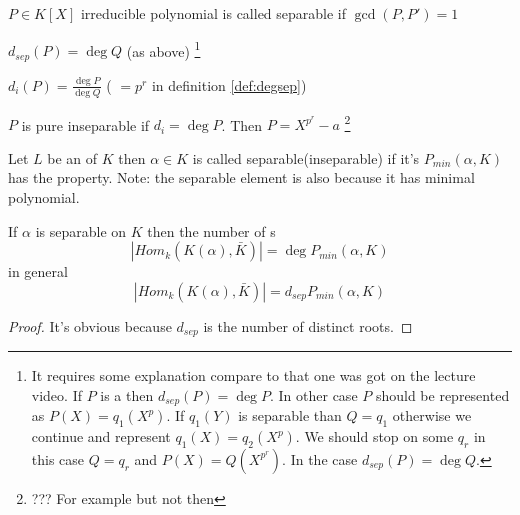 \begin{definition}
  $P\in K\left[X\right]$ irreducible polynomial is called separable if
  $\gcd\left(P, P'\right) = 1$
  \label{def:separablepolynomial}
\end{definition}

\begin{definition}
  $d_{sep}(P) = \deg Q$ (as above)
  \footnote{    
    It requires some explanation compare to that one was got on the
    lecture video.
    If $P$ is a  then
    $d_{sep}(P) = \deg P$. In other case $P$ should be represented as
    $P\left(X\right) = q_1(X^p)$. If $q_1\left(Y\right)$ is separable
    than $Q = q_1$ otherwise we continue and represent
    $q_1\left(X\right) = q_2\left(X^p\right)$. We should stop on some
    $q_r$ in this case $Q = q_r$ and $P\left(X\right) =
    Q\left(X^{p^r}\right)$. In the case $d_{sep}(P) = \deg Q$.
  }
  \label{def:degsep}
\end{definition}

\begin{definition}
  $d_{i}(P) = \frac{\deg P}{\deg Q}$ ( $=p^r$ in definition
  \ref{def:degsep}) 
  \label{def:deginsep}
\end{definition}

\begin{definition}
  $P$ is pure inseparable if $d_i = \deg P$.
  Then $P = X^{p^r} - a$
  \footnote{
    ??? For example but not then
  }
  \label{def:deginseppol}
\end{definition}

\begin{definition}
  Let $L$ be an  of $K$ then $\alpha \in K$ is
  called separable(inseparable) if it's
   $P_{min}\left(\alpha, K\right)$ has
  the property.
  Note: the separable element is also 
  because it has minimal polynomial.
  \label{def:degsepelem}
\end{definition}

\begin{proposition}
  If $\alpha$ is separable on $K$ then the number of
  s
  \[
  \left|Hom_k\left(K\left(\alpha\right), \bar{K}\right)\right| =
  \deg P_{min}\left(\alpha, K\right)
  \]
  in general
  \[
  \left|Hom_k\left(K\left(\alpha\right), \bar{K}\right)\right| =
  d_{sep} P_{min}\left(\alpha, K\right)
  \]  
  \begin{proof}
    It's obvious because $d_{sep}$ is the number of distinct roots.
  \end{proof}
  \label{prop:lec3_2}
\end{proposition}

